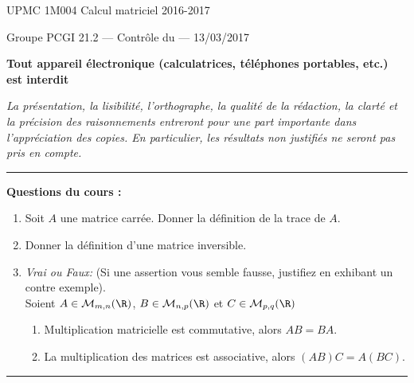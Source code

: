 \documentclass[11pt]{article}
\begin{document}
{\large UPMC \hfill 1M004 Calcul matriciel \hfill 2016-2017}

\vskip -3mm
\noindent \textbf{\hrulefill}

\vskip 1mm

\centerline{
{\large Groupe PCGI 21.2 \hspace{1.7 cm} --- Contrôle du --- \hspace{3.5 cm}  13/03/2017}}


\vskip -2mm
\noindent \textbf{\hrulefill}



\vskip 2mm

\centerline{\textbf{Tout appareil \'electronique (calculatrices, t\'el\'ephones portables, etc.) est interdit}}

\vskip 2mm



{\sl  La pr\'esentation, la lisibilit\'e, l'orthographe, la
 qualit\'e de la r\'edaction, la clart\'e et la pr\'ecision des
 raisonnements entreront pour une part importante dans
 l'appr\'eciation des copies. En particulier, les r\'esultats non
 justifi\'es ne seront pas pris en compte. }


\vskip 3mm
\hrule

\vskip 3mm

\textbf{Questions du cours :} 
\begin{enumerate}
\item  Soit $A$ une matrice carrée. Donner la définition de la trace de $A$.
\item Donner la définition d'une matrice inversible.
\item  \emph{Vrai ou Faux:} (Si une assertion vous semble fausse, justifiez en exhibant un contre exemple).\\
 Soient $A \in \mathcal{M}_{m,n}(\R)$, $B \in \mathcal{M}_{n,p}(\R)$ et $C \in \mathcal{M}_{p,q}(\R)$
\begin{enumerate}
\item Multiplication matricielle est commutative, alors $AB = BA$.
\item La multiplication des matrices est associative, alors $(AB)C = A(BC)$.
\end{enumerate}
       
\end{enumerate}
\vskip 0.2cm
  \hrule
\vskip 2mm
\end{document}
